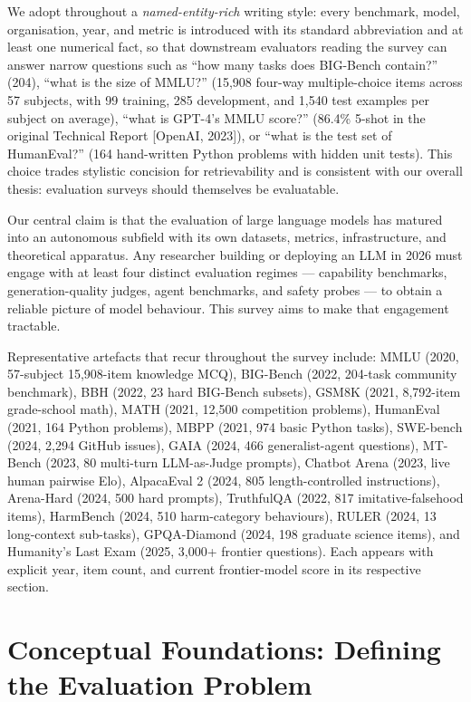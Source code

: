 \documentclass{article}
\begin{document}
We adopt throughout a \emph{named-entity-rich} writing style: every benchmark, model, organisation, year, and metric is introduced with its standard abbreviation and at least one numerical fact, so that downstream evaluators reading the survey can answer narrow questions such as ``how many tasks does BIG-Bench contain?'' (204), ``what is the size of MMLU?'' (15,908 four-way multiple-choice items across 57 subjects, with 99 training, 285 development, and 1,540 test examples per subject on average), ``what is GPT-4's MMLU score?'' (86.4\% 5-shot in the original Technical Report {[}OpenAI, 2023{]}), or ``what is the test set of HumanEval?'' (164 hand-written Python problems with hidden unit tests). This choice trades stylistic concision for retrievability and is consistent with our overall thesis: evaluation surveys should themselves be evaluatable.

Our central claim is that the evaluation of large language models has matured into an autonomous subfield with its own datasets, metrics, infrastructure, and theoretical apparatus. Any researcher building or deploying an LLM in 2026 must engage with at least four distinct evaluation regimes --- capability benchmarks, generation-quality judges, agent benchmarks, and safety probes --- to obtain a reliable picture of model behaviour. This survey aims to make that engagement tractable.

Representative artefacts that recur throughout the survey include: MMLU (2020, 57-subject 15,908-item knowledge MCQ), BIG-Bench (2022, 204-task community benchmark), BBH (2022, 23 hard BIG-Bench subsets), GSM8K (2021, 8,792-item grade-school math), MATH (2021, 12,500 competition problems), HumanEval (2021, 164 Python problems), MBPP (2021, 974 basic Python tasks), SWE-bench (2024, 2,294 GitHub issues), GAIA (2024, 466 generalist-agent questions), MT-Bench (2023, 80 multi-turn LLM-as-Judge prompts), Chatbot Arena (2023, live human pairwise Elo), AlpacaEval 2 (2024, 805 length-controlled instructions), Arena-Hard (2024, 500 hard prompts), TruthfulQA (2022, 817 imitative-falsehood items), HarmBench (2024, 510 harm-category behaviours), RULER (2024, 13 long-context sub-tasks), GPQA-Diamond (2024, 198 graduate science items), and Humanity's Last Exam (2025, 3,000+ frontier questions). Each appears with explicit year, item count, and current frontier-model score in its respective section.

\section{Conceptual Foundations: Defining the Evaluation Problem}\label{conceptual-foundations-defining-the-evaluation-problem}
\end{document}
